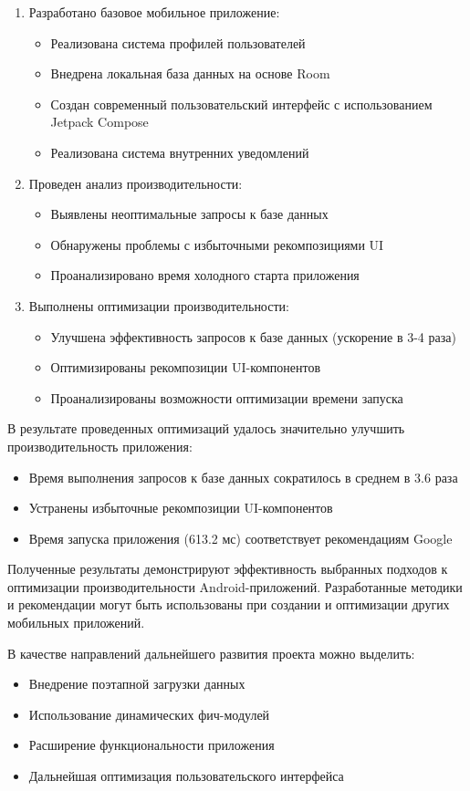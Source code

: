 \documentclass[14pt, russian]{scrartcl}
\begin{document}
\begin{enumerate}
\item Разработано базовое мобильное приложение:
   \begin{itemize}
   \item Реализована система профилей пользователей
   \item Внедрена локальная база данных на основе Room
   \item Создан современный пользовательский интерфейс с использованием Jetpack Compose
   \item Реализована система внутренних уведомлений
   \end{itemize}

\item Проведен анализ производительности:
   \begin{itemize}
   \item Выявлены неоптимальные запросы к базе данных
   \item Обнаружены проблемы с избыточными рекомпозициями UI
   \item Проанализировано время холодного старта приложения
   \end{itemize}

\item Выполнены оптимизации производительности:
   \begin{itemize}
   \item Улучшена эффективность запросов к базе данных (ускорение в 3-4 раза)
   \item Оптимизированы рекомпозиции UI-компонентов
   \item Проанализированы возможности оптимизации времени запуска
   \end{itemize}
\end{enumerate}

В результате проведенных оптимизаций удалось значительно улучшить производительность приложения:
\begin{itemize}
\item Время выполнения запросов к базе данных сократилось в среднем в 3.6 раза
\item Устранены избыточные рекомпозиции UI-компонентов
\item Время запуска приложения (613.2 мс) соответствует рекомендациям Google
\end{itemize}

Полученные результаты демонстрируют эффективность выбранных подходов к оптимизации производительности Android-приложений. Разработанные методики и рекомендации могут быть использованы при создании и оптимизации других мобильных приложений.

В качестве направлений дальнейшего развития проекта можно выделить:
\begin{itemize}
\item Внедрение поэтапной загрузки данных
\item Использование динамических фич-модулей
\item Расширение функциональности приложения
\item Дальнейшая оптимизация пользовательского интерфейса
\end{itemize}
\end{document}
